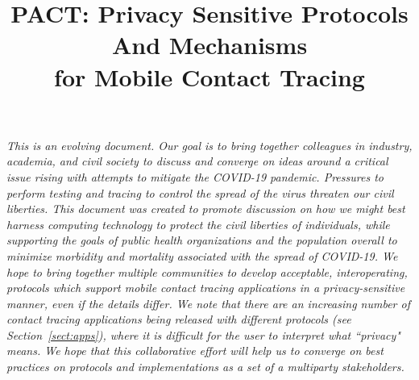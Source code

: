 \documentclass{article}
\title{{\Huge PACT\/}:   {\Huge P\/}rivacy Sensitive Protocols {\Huge A\/}nd Mechanisms
\\for Mobile {\Huge C\/}ontact {\Huge T\/}racing }
\date{}
\begin{document}
\maketitle

\emph{This is an evolving document. Our goal is to bring together colleagues in industry, academia, and civil society to discuss and converge on ideas around a critical issue rising with attempts to mitigate the COVID-19 pandemic. Pressures to perform testing and tracing to control the spread of the virus threaten our civil liberties. 
This document was created to promote discussion on how we might best harness computing technology to protect the civil liberties of individuals, while supporting the goals of public health organizations and the population overall to minimize morbidity and mortality associated with the spread of COVID-19. 
We hope to bring together multiple communities to develop acceptable, interoperating, protocols which support mobile contact tracing applications in a privacy-sensitive manner, even if the details differ. We note that there are an increasing number of contact tracing applications being released with different protocols (see Section~\ref{sect:apps}), where it is difficult for the user to interpret what ``privacy" means. We hope that this collaborative effort will help us to converge on best practices on protocols and implementations as a set of a multiparty stakeholders.
}

\iffalse
This is an evolving document. Our goal is to bring together colleagues in industry, academia, and civil society to discuss and converge on ideas around a critical issue rising with attempts to mitigate the COVID-19 pandemic. Specifically, pressures to perform testing and tracing to control the spread of the virus threaten our civil liberties. Early implementations have been imposed by authoritarian and democratic regimes.  We created this document to promote discussion on how we might best harness computing technology to protect the civil liberties of individuals, while supporting the goals of public health organizations and the population overall to minimize morbidity and mortality associated with the spread of COVID-19. We focus on privacy-sensitive methods and protocols that could be employed with any mobile tracing applications. We hope to bring together multiple communities to develop acceptable, interoperating, protocols which support mobile contact tracing applications, even if the details of the approaches differ. We note that there are an increasing number of contact tracing applications being released with different protocols, some without privacy considerations and others where it is difficult to interpret what "privacy" means. We hope that this effort will help us to converge on best practices on protocols and implementations as a set of a multiparty stakeholders.
\fi
\end{document}
